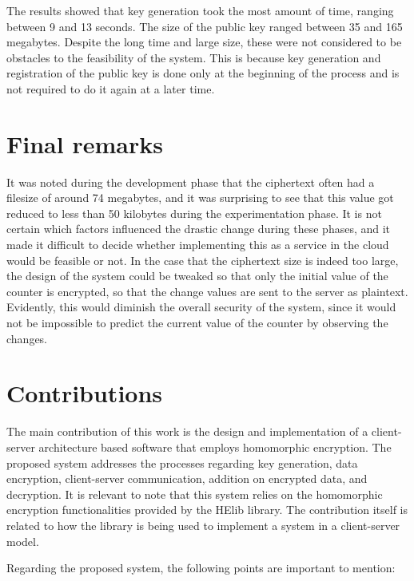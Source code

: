 The results showed that key generation took the most amount of time, ranging between 9 and 13 seconds. The size of the public key ranged between 35 and 165 megabytes. Despite the long time and large size, these were not considered to be obstacles to the feasibility of the system. This is because key generation and registration of the public key is done only at the beginning of the process and is not required to do it again at a later time.

\section{Final remarks}

It was noted during the development phase that the ciphertext often had a filesize of around 74 megabytes, and it was surprising to see that this value got reduced to less than 50 kilobytes during the experimentation phase. It is not certain which factors influenced the drastic change during these phases, and it made it difficult to decide whether implementing this as a service in the cloud would be feasible or not. In the case that the ciphertext size is indeed too large, the design of the system could be tweaked so that only the initial value of the counter is encrypted, so that the change values are sent to the server as plaintext. Evidently, this would diminish the overall security of the system, since it would not be impossible to predict the current value of the counter by observing the changes. 

\section{Contributions}

The main contribution of this work is the design and implementation of a client-server architecture based software that employs homomorphic encryption. The proposed system addresses the processes regarding key generation, data encryption, client-server communication, addition on encrypted data, and decryption. It is relevant to note that this system relies on the homomorphic encryption functionalities provided by the HElib library. The contribution itself is related to how the library is being used to implement a system in a client-server model.

Regarding the proposed system, the following points are important to mention:

